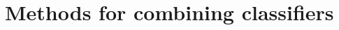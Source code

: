 \documentclass[prd, twocolumn, lengthcheck, superscriptaddress, showpacs, letterpaper, nofootinbib]{revtex4-1}
\newcommand\MLAmax{\ac{MLA}${}_{\mathrm{max}}$}
\begin{document}

\section{Methods for combining classifiers }
\label{combining}

\end{document}
